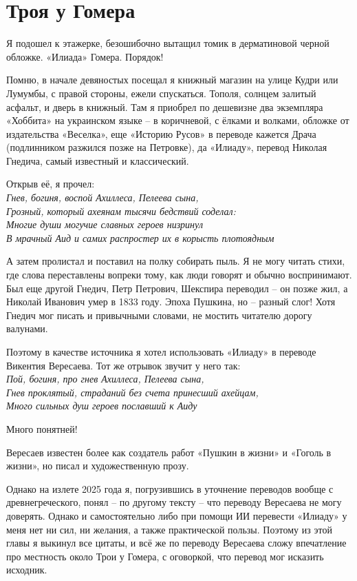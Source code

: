 \chapter{Троя у Гомера}

Я подошел к этажерке, безошибочно вытащил томик в дерматиновой черной обложке. «Илиада» Гомера. Порядок!

Помню, в начале девяностых посещал я книжный магазин на улице Кудри или Лумумбы, с правой стороны, ежели спускаться. Тополя, солнцем залитый асфальт, и дверь в книжный. Там я приобрел по дешевизне два экземпляра «Хоббита» на украинском языке – в коричневой, с ёлками и волками, обложке от издательства «Веселка», еще «Историю Русов» в переводе кажется Драча (подлинником разжился позже на Петровке), да «Илиаду», перевод Николая Гнедича, самый известный и классический. 

Открыв её, я прочел:\\

\noindent
\textit{Гнев, богиня, воспой Ахиллеса, Пелеева сына,\\
Грозный, который ахеянам тысячи бедствий соделал:\\
Многие души могучие славных героев низринул\\
В мрачный Аид и самих распростер их в корысть плотоядным\\}

А затем пролистал и поставил на полку собирать пыль. Я не могу читать стихи, где слова переставлены вопреки тому, как люди говорят и обычно воспринимают. Был еще другой Гнедич, Петр Петрович, Шекспира переводил – он позже жил, а Николай Иванович умер в 1833 году. Эпоха Пушкина, но – разный слог! Хотя Гнедич мог писать и привычными словами, не мостить читателю дорогу валунами.

Поэтому в качестве источника я хотел использовать «Илиаду» в переводе Викентия Вересаева. Тот же отрывок звучит у него так:\\

\noindent
\textit{Пой, богиня, про гнев Ахиллеса, Пелеева сына,\\
Гнев проклятый, страданий без счета принесший ахейцам,\\
Много сильных душ героев пославший к Аиду\\}

Много понятней!

Вересаев известен более как создатель работ «Пушкин в жизни» и «Гоголь в жизни», но писал и художественную прозу.

Однако на излете 2025 года я, погрузившись в уточнение переводов вообще с древнегреческого, понял – по другому тексту – что переводу Вересаева не могу доверять. Однако и самостоятельно либо при помощи ИИ перевести «Илиаду» у меня нет ни сил, ни желания, а также практической пользы. Поэтому из этой главы я выкинул все цитаты, и всё же по переводу Вересаева сложу впечатление про местность около Трои у Гомера,    с оговоркой, что перевод мог исказить исходник.

